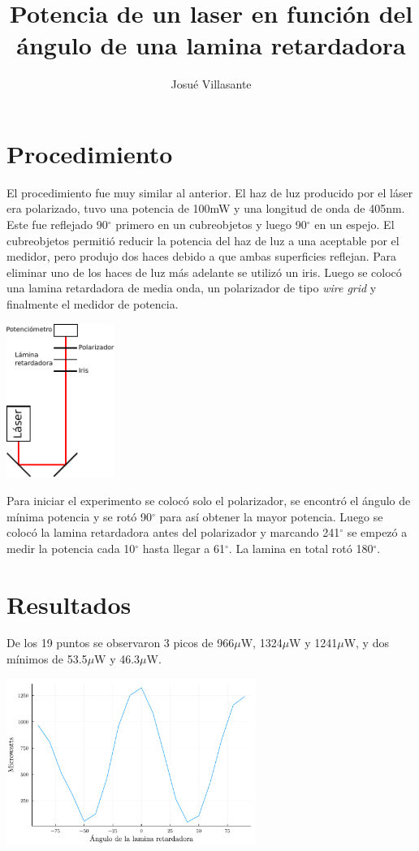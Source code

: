\documentclass[twocolumn]{article}
\author{Josué Villasante}
\title{Potencia de un laser en función del ángulo de una lamina retardadora}
\begin{document}
	\maketitle

	\section{Procedimiento}
		El procedimiento fue muy similar al anterior. El haz de luz producido por el láser era polarizado, tuvo una potencia de 100mW y una longitud de onda de 405nm. Este fue reflejado 90$^{\circ}$ primero en un cubreobjetos y luego 90$^{\circ}$ en un espejo. El cubreobjetos permitió reducir la potencia del haz de luz a una aceptable por el medidor, pero produjo dos haces debido a que ambas superficies reflejan. Para eliminar uno de los haces de luz más adelante se utilizó un iris. Luego se colocó una lamina retardadora de media onda, un polarizador de tipo \emph{wire grid} y finalmente el medidor de potencia.

		\begin{center}
			\includegraphics[width=100pt]{img/layout.pdf}
		\end{center}

		Para iniciar el experimento se colocó solo el polarizador, se encontró el ángulo de mínima potencia y se rotó 90$^{\circ}$ para así obtener la mayor potencia. Luego se colocó la lamina retardadora antes del polarizador y marcando 241$^{\circ}$ se empezó a medir la potencia cada 10$^{\circ}$ hasta llegar a 61$^{\circ}$. La lamina en total rotó 180$^{\circ}$.
	
	\section{Resultados}
		De los 19 puntos se observaron 3 picos de 966$\mu$W, 1324$\mu$W y 1241$\mu$W, y dos mínimos de 53.5$\mu$W y 46.3$\mu$W.

		\begin{center}
			\includegraphics[width=230pt]{img/results.pdf}
		\end{center}
	
\end{document}
